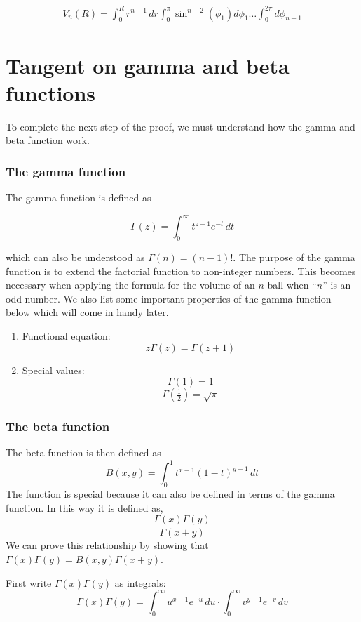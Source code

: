 \documentclass{article}
\begin{document}
\begin{align*}
    V_n(R) = \int_{0}^{R}r^{n-1}\,dr\int_{0}^{\pi}\sin^{n-2}(\phi_1)d\phi_1\dots\int_{0}^{2\pi}d\phi_{n-1}
\end{align*}









\section*{Tangent on gamma and beta functions}
To complete the next step of the proof, we must understand how the gamma and beta function work. 

\subsubsection*{The gamma function}
The gamma function is defined as 

\[\Gamma(z) = \int_0^\infty t^{z-1}e^{-t}\,dt\]

which can also be understood as $\Gamma(n) = (n-1)!$. The purpose of the gamma function is to extend the factorial function to non-integer numbers. This becomes necessary when applying the formula for the volume of an $n$-ball when ``$n$'' is an odd number. We also list some important properties of the gamma function below which will come in handy later.
\begin{enumerate}
\item Functional equation: 
    \[z\Gamma(z) = \Gamma(z+1)\]

\item Special values:
    \[\Gamma(1) = 1\]
    \[\Gamma(\tfrac{1}{2}) = \sqrt{\pi}\]

\end{enumerate}



\subsubsection*{The beta function}
The beta function is then defined as 
\[
B(x,y) = \int_0^1 t^{x-1}(1-t)^{y-1}\,dt
\]
The function is special because it can also be defined in terms of the gamma function. In this way it is defined as,
\[
\frac{\Gamma(x)\Gamma(y)}{\Gamma(x+y)}
\]
We can prove this relationship by showing that $\Gamma(x)\Gamma(y) = B(x,y)\Gamma(x+y)$.


First write $\Gamma(x)\Gamma(y)$ as integrals:
\[
\Gamma(x)\Gamma(y) = \int_0^\infty u^{x-1}e^{-u}\,du \cdot \int_0^\infty v^{y-1}e^{-v}\,dv
\]
\end{document}
